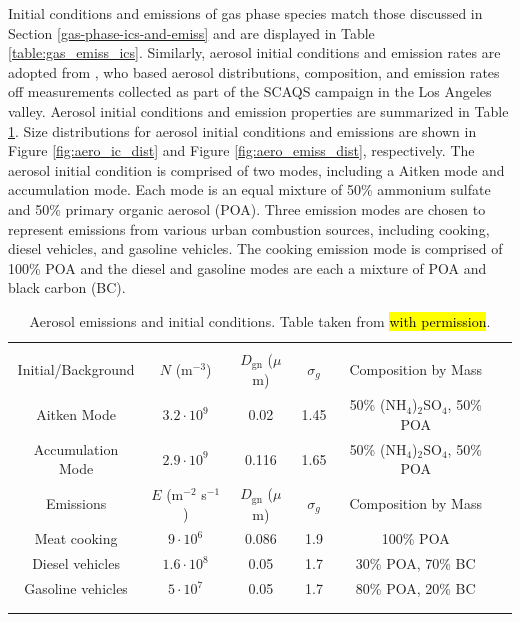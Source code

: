 Initial conditions and emissions of gas phase species match those discussed in Section \ref{gas-phase-ics-and-emiss} and are displayed in Table \ref{table:gas_emiss_ics}. Similarly, aerosol initial conditions and emission rates are adopted from \cite{riemer_simulating_2009}, who based aerosol distributions, composition, and emission rates off measurements collected as part of the SCAQS campaign in the Los Angeles valley. Aerosol initial conditions and emission properties are summarized in Table \ref{table:aero_emiss_ics}. Size distributions for aerosol initial conditions and emissions are shown in Figure \ref{fig:aero_ic_dist} and Figure \ref{fig:aero_emiss_dist}, respectively. The aerosol initial condition is comprised of two modes, including a Aitken mode and accumulation mode. Each mode is an equal mixture of 50\% ammonium sulfate and 50\% primary organic aerosol (POA). Three emission modes are chosen to represent emissions from various urban combustion sources, including cooking, diesel vehicles, and gasoline vehicles. The cooking emission mode is comprised of 100\% POA and the diesel and gasoline modes are each a mixture of POA and black carbon (BC). 

\begin{table}[h]
\centering
\caption{Aerosol emissions and initial conditions. Table taken from \cite{riemer_simulating_2009} \hl{with permission}.}
\begin{tabular*}{\linewidth}{@{\extracolsep{\fill}} cccccc}
\\[-2ex]\hline 
     \hline \\[-2ex] Initial/Background  & $N$ (m$^{-3}$) & $D_{\text{gn}}$ ($\mu$m) & $\sigma_g$ & Composition by Mass\\
 \midrule
Aitken Mode & $3.2 \cdot 10^9$ & 0.02 & 1.45 & 50\% (NH$_4$)$_2$SO$_4$, 50\% POA\\
Accumulation Mode & $2.9 \cdot 10^9$ & 0.116 & 1.65 & 50\% (NH$_4$)$_2$SO$_4$, 50\% POA\\
\midrule
Emissions & $E$ (m$^{-2}$ s$^{-1}$) & $D_{\text{gn}}$ ($\mu$m) & $\sigma_g$ & Composition by Mass\\
\midrule
Meat cooking & $9 \cdot 10^6$ & 0.086 & 1.9 & 100\% POA\\
Diesel vehicles & $1.6 \cdot 10^8$ & 0.05 & 1.7 & 30\% POA, 70\% BC \\
Gasoline vehicles & $5 \cdot 10^7$ & 0.05 & 1.7 & 80\% POA, 20\% BC \\
\\[-2ex]\hline 
     \hline \\[-2ex]
\end{tabular*}
\label{table:aero_emiss_ics}
\end{table}

